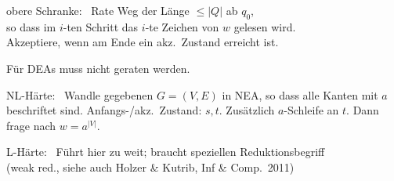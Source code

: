 \begin{frame}
{        \par\bigskip
        obere Schranke:~ Rate Weg der Länge $\leq |Q|$ ab $q_0$, \\
        so dass im $i$-ten Schritt das $i$-te Zeichen von $w$ gelesen wird. \\
        Akzeptiere, wenn am Ende ein akz.\ Zustand erreicht ist.
        
        \par\smallskip
        Für DEAs muss nicht geraten werden.
        
        \par\bigskip
        NL-Härte:~ Wandle gegebenen $G=(V,E)$ in NEA, so dass
        alle Kanten mit $a$ beschriftet sind. Anfangs-/akz.\ Zustand: $s,t$.
        Zusätzlich $a$-Schleife an $t$. Dann frage nach $w = a^{|V|}$.
        
        \par\bigskip
        L-Härte:~ Führt hier zu weit; braucht speziellen Reduktionsbegriff \\
        (weak red., siehe auch Holzer \& Kutrib, Inf \& Comp.\ 2011)
        
        \par
        
      }
    \end{frame}


